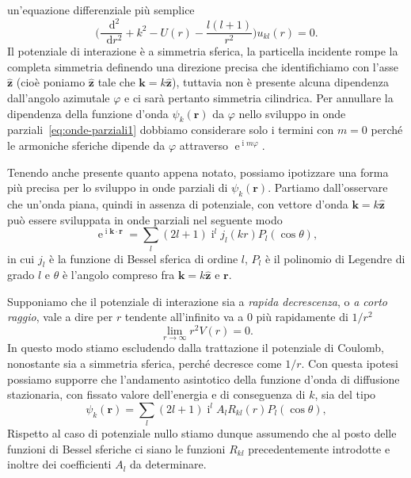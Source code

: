 \documentclass[a4paper,fleqn,twoside,12pt]{article}
\renewcommand{\phi}{\varphi}
\newcommand*{\dd}{\mathop{}\!\mathrm{d}} %
\DeclareMathOperator{\e}{\mathrm{e}} %
\DeclareMathOperator{\uimm}{\mathrm{i}} %
\newcommand*{\toder}[3][]{\frac{{\dd^{#1}}#2}{\dd {#3}^{#1}}}
\newcommand*{\versor}[1]{\hat{\bm{#1}}}
\begin{document}
un'equazione differenziale più semplice
\begin{equation}
  \label{eq:diff-u-op}
  \bigg(\toder[2]{}{r} + k^{2} - U(r) - \frac{l(l+1)}{r^{2}}\bigg)u_{kl}(r) = 0.
\end{equation}
Il potenziale di interazione è a simmetria sferica, la particella incidente
rompe la completa simmetria definendo una direzione precisa che identifichiamo
con l'asse $\versor{z}$ (cioè poniamo $\versor{z}$ tale che
$\bm{k} = k\versor{z}$), tuttavia non è presente alcuna dipendenza dall'angolo
azimutale $\phi$ e ci sarà pertanto simmetria cilindrica.  Per annullare la
dipendenza della funzione d'onda $\psi_{k}(\bm{r})$ da $\phi$ nello sviluppo in
onde parziali~\eqref{eq:onde-parziali1} dobbiamo considerare solo i termini con
$m = 0$ perché le armoniche sferiche dipende da $\phi$ attraverso
$\e^{\uimm m \phi}$.

Tenendo anche presente quanto appena notato, possiamo ipotizzare una forma più
precisa per lo sviluppo in onde parziali di $\psi_{k}(\bm{r})$.  Partiamo
dall'osservare che un'onda piana, quindi in assenza di potenziale, con vettore
d'onda $\bm{k} = k\versor{z}$ può essere sviluppata in onde parziali nel
seguente modo
\begin{equation}
  \label{eq:sviluppo-onda-piana}
  \e^{\uimm \bm{k}\cdot\bm{r}} = \sum_{l} (2l+1) \uimm^{l} j_{l}(kr)
  P_{l}(\cos\theta),
\end{equation}
in cui $j_{l}$ è la funzione di Bessel sferica di ordine $l$, $P_{l}$ è il
polinomio di Legendre di grado $l$ e $\theta$ è l'angolo compreso fra
$\bm{k} = k\versor{z}$ e $\bm{r}$.

Supponiamo che il potenziale di interazione sia a \emph{rapida decrescenza}, o
\emph{a corto raggio}, vale a dire per $r$ tendente all'infinito va a $0$ più
rapidamente di $1/r^{2}$
\begin{equation}
  \lim_{r \to \infty} r^{2}V(r) = 0.
\end{equation}
In questo modo stiamo escludendo dalla trattazione il potenziale di Coulomb,
nonostante sia a simmetria sferica, perché decresce come $1/r$.  Con questa
ipotesi possiamo supporre che l'andamento asintotico della funzione d'onda di
diffusione stazionaria, con fissato valore dell'energia e di conseguenza di $k$,
sia del tipo
\begin{equation}
  \label{eq:onde-parziali2}
  \psi_{k}(\bm{r}) = \sum_{l} (2l+1)\uimm^{l} A_{l} R_{kl}(r) P_{l}(\cos\theta),
\end{equation}
Rispetto al caso di potenziale nullo stiamo dunque assumendo che al posto delle
funzioni di Bessel sferiche ci siano le funzioni $R_{kl}$ precedentemente
introdotte e inoltre dei coefficienti $A_{l}$ da determinare.
\end{document}
